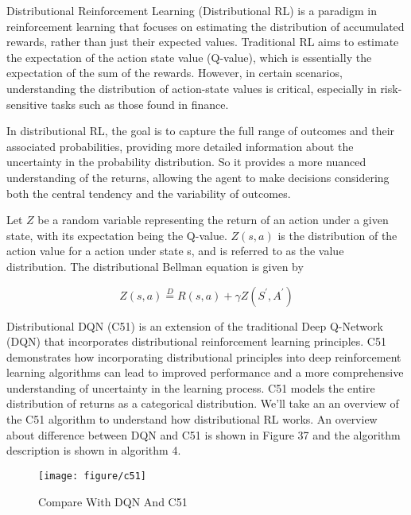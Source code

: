 \documentclass{article}
\begin{document}
Distributional Reinforcement Learning (Distributional RL) is a paradigm in reinforcement learning that focuses on estimating the distribution of accumulated rewards, rather than just their expected values. Traditional RL aims to estimate the expectation of the action state value (Q-value), which is essentially the expectation of the sum of the rewards. However, in certain scenarios, understanding the distribution of action-state values is critical, especially in risk-sensitive tasks such as those found in finance.

In distributional RL, the goal is to capture the full range of outcomes and their associated probabilities, providing more detailed information about the uncertainty in the probability distribution. So it provides a more nuanced understanding of the returns, allowing the agent to make decisions considering both the central tendency and the variability of outcomes.

Let $Z$ be a random variable representing the return of an action under a given state, with its expectation being the Q-value. $Z(s,a)$ is the distribution of the action value for a action under state s, and is referred to as the value distribution. The distributional Bellman equation is given by

\begin{equation}
Z(s, a) \stackrel{D}{=} R(s, a)+\gamma Z\left(S^{\prime}, A^{\prime}\right)
\end{equation}

Distributional DQN (C51) is an extension of the traditional Deep Q-Network (DQN) that incorporates distributional reinforcement learning principles. C51 demonstrates how incorporating distributional principles into deep reinforcement learning algorithms can lead to improved performance and a more comprehensive understanding of uncertainty in the learning process. C51 models the entire distribution of returns as a categorical distribution. We'll take an an overview of the C51 algorithm to understand how distributional RL works. An overview about difference between DQN and C51 is shown in Figure 37 and the algorithm description is shown in algorithm 4.



\begin{figure}[htbp]
        \centering
        \texttt{[image: figure/c51]}
        \caption{Compare With DQN And C51}
     \end{figure}
\end{document}
